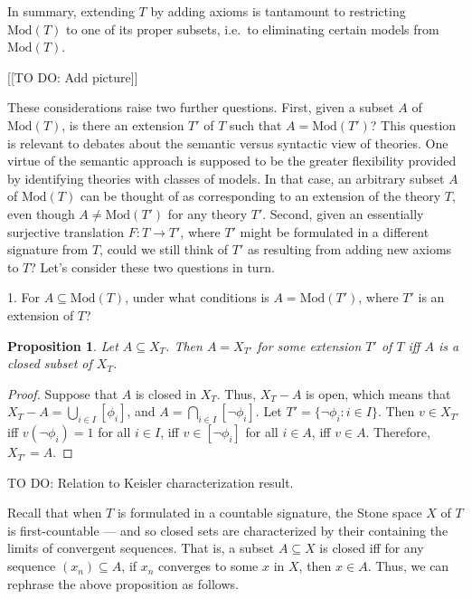 \documentclass[11pt]{article}
\newtheorem{prop}{Proposition}
\theoremstyle{definition}
\theoremstyle{remark}
\begin{document}
In summary, extending $T$ by adding axioms is tantamount to
restricting $\mathrm{Mod}(T)$ to one of its proper subsets, i.e.\ to
eliminating certain models from $\mathrm{Mod}(T)$.

[[TO DO: Add picture]]

These considerations raise two further questions.  First, given a
subset $A$ of $\mathrm{Mod}(T)$, is there an extension $T'$ of $T$
such that $A=\mathrm{Mod}(T')$?  This question is relevant to debates
about the semantic versus syntactic view of theories.  One virtue of
the semantic approach is supposed to be the greater flexibility
provided by identifying theories with classes of models.  In that
case, an arbitrary subset $A$ of $\mathrm{Mod}(T)$ can be thought of
as corresponding to an extension of the theory $T$, even though $A\neq
\mathrm{Mod}(T')$ for any theory $T'$.  Second, given an essentially
surjective translation $F:T\to T'$, where $T'$ might be formulated in
a different signature from $T$, could we still think of $T'$ as
resulting from adding new axioms to $T$?  Let's consider these two
questions in turn.

1. For $A\subseteq \mathrm{Mod}(T)$, under what conditions is
$A=\mathrm{Mod}(T')$, where $T'$ is an extension of $T$?  

\begin{prop} Let $A\subseteq X_T$.  Then $A=X_{T'}$ for some extension
  $T'$ of $T$ iff $A$ is a closed subset of $X_T$. \end{prop}

\begin{proof} Suppose that $A$ is closed in $X_T$.  Thus, $X_T-A$ is
  open, which means that $X_T-A=\bigcup _{i\in I}[\phi _i]$, and
  $A=\bigcap _{i\in I}[\neg \phi _i]$.  Let $T'=\{ \neg \phi _i:i\in
  I\}$.  Then $v\in X_{T'}$ iff $v(\neg \phi _i)=1$ for all $i\in I$,
  iff $v\in [\neg \phi _i]$ for all $i\in A$, iff $v\in A$.
  Therefore, $X_{T'}=A$.
\end{proof}

TO DO: Relation to Keisler characterization result.




Recall that when $T$ is formulated in a countable signature, the Stone
space $X$ of $T$ is first-countable --- and so closed sets are
characterized by their containing the limits of convergent sequences.
That is, a subset $A\subseteq X$ is closed iff for any sequence
$(x_n)\subseteq A$, if $x_n$ converges to some $x$ in $X$, then $x\in
A$.  Thus, we can rephrase the above proposition as follows.
\end{document}
